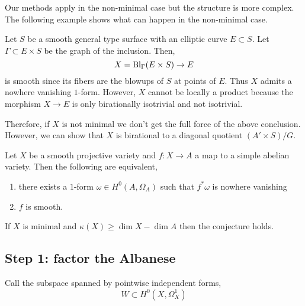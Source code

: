 \documentclass[12pt]{article}
\begin{document}
Our methods apply in the non-minimal case but the structure is more complex. The following example shows what can happen in the non-minimal case.

\begin{example}
Let $S$ be a smooth general type surface with an elliptic curve $E \subset S$. Let $\Gamma \subset E \times S$ be the graph of the inclusion. Then,
\[ X = \mathrm{Bl}_{\Gamma}(E \times S) \to E \]
is smooth since its fibers are the blowups of $S$ at points of $E$. Thus $X$ admits a nowhere vanishing $1$-form. However, $X$ cannot be \etale locally a product because the morphism $X \to E$ is only birationally isotrivial and not isotrivial.
\end{example}

\begin{rmk}
Therefore, if $X$ is not minimal we don't get the full force of the above conclusion. However, we can show that $X$ is birational to a diagonal quotient $(A' \times S)/G$.
\end{rmk}

\begin{conj}[Hao]
Let $X$ be a smooth projective variety and $f : X \to A$ a map to a simple abelian variety. Then the following are equivalent,
\begin{enumerate}
\item there exists a $1$-form $\omega \in H^0(A, \Omega_A)$ such that $f^* \omega$ is nowhere vanishing
\item $f$ is smooth.
\end{enumerate}
\end{conj}

\begin{theorem}[CCH, '23]
If $X$ is minimal and $\kappa(X) \ge \dim{X} - \dim{A}$ then the conjecture holds. 
\end{theorem}

\subsection{Step 1: factor the Albanese}

Call the subspace spanned by pointwise independent forms,
\[ W \subset H^0(X, \Omega_X^1) \]

\newcommand{\can}{\mathrm{can}}
\end{document}
